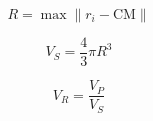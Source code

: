 \begin{equation}
R = \max \| r_i - \text{CM} \|
\label{eq:radius_protein}
\end{equation}

\vspace{-12pt} %

\begin{equation}
V_{S} = \frac{4}{3} \pi R^3
\label{eq:volume_sphere}
\end{equation}

\vspace{-12pt} %

\begin{equation}
V_R = \frac{V_{P}}{V_{S}}
\label{eq:volume_ratio}
\end{equation}


